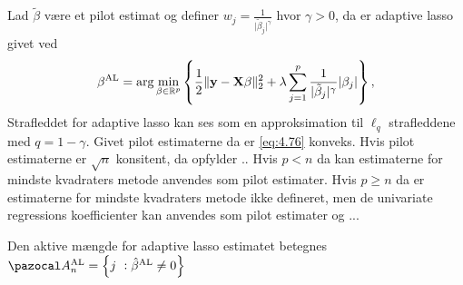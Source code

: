 Lad \(\tilde{\beta}\) være et pilot estimat og definer $w_j = \frac{1}{\vert \tilde{\beta}_j \vert^\gamma}$ hvor \(\gamma>0\), da er adaptive lasso givet ved
\begin{align}
\beta^\text{AL} = \arg \min_{\beta \in \R^p} \cbr{\frac{1}{2} \Vert \y - \X \beta \Vert_2^2 + \lambda \sum_{j=1}^p \frac{1}{\vert \tilde{\beta}_j \vert^\gamma} \vert \beta_j \vert}, \label{eq:4.76}
\end{align}
Strafleddet for adaptive lasso kan ses som en approksimation til $\ell_q$ strafleddene med $q=1-\gamma$.
Givet pilot estimaterne da er \eqref{eq:4.76} konveks.
Hvis pilot estimaterne er \(\sqrt{n}\) konsitent, da opfylder ..
Hvis \(p <n\) da kan estimaterne for mindste kvadraters metode anvendes som pilot estimater. Hvis \(p \geq n\) da er estimaterne for mindste kvadraters metode ikke defineret, men de univariate regressions koefficienter kan anvendes som pilot estimater og ...

Den aktive mængde for adaptive lasso estimatet betegnes \(\mathcal{A}_n^\text{AL} = \cbr{j \ : \hat{\beta}^{\text{AL}} \neq 0 }\)

